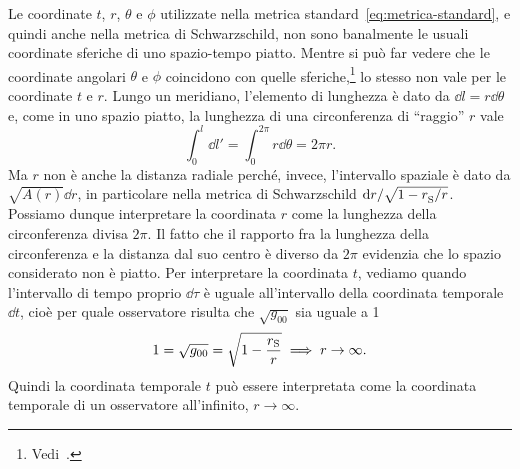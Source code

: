 Le coordinate $t$, $r$, $\theta$ e $\phi$ utilizzate nella metrica
standard~\eqref{eq:metrica-standard}, e quindi anche nella metrica di
Schwarzschild, non sono banalmente le usuali coordinate sferiche di uno
spazio-tempo piatto.  Mentre si può far vedere che le coordinate angolari
$\theta$ e $\phi$ coincidono con quelle
sferiche,\footnote{Vedi~\textcite[333]{ohanian:gravitazione}.} lo stesso non
vale per le coordinate $t$ e $r$.  Lungo un meridiano, l'elemento di lunghezza è
dato da $\dd l = r\dd\theta$ e, come in uno spazio piatto, la lunghezza di una
circonferenza di ``raggio'' $r$ vale
\begin{equation}
  \int_{0}^{l} \dd l' = \int_{0}^{2\pi}r\dd\theta = 2\pi r.
\end{equation}
Ma $r$ non è anche la distanza radiale perché, invece, l'intervallo spaziale è
dato da $\sqrt{A(r)}\dd r$, in particolare nella metrica di Schwarzschild
$\mathop{}\!\mathrm{d} r/\sqrt{1-r_{\textup{S}}^{}/r}$.  Possiamo dunque interpretare la
coordinata $r$ come la lunghezza della circonferenza divisa $2\pi$.  Il fatto
che il rapporto fra la lunghezza della circonferenza e la distanza dal suo
centro è diverso da $2\pi$ evidenzia che lo spazio considerato non è piatto.
Per interpretare la coordinata $t$, vediamo quando l'intervallo di tempo proprio
$\dd\tau$ è uguale all'intervallo della coordinata temporale $\dd t$, cioè per
quale osservatore risulta che $\sqrt{g_{00}}$ sia uguale a 1
\begin{equation}
  1 = \sqrt{g_{00}} = \sqrt{1 - \frac{r_{\textup{S}}}{r}} \implies r \to \infty.
\end{equation}
Quindi la coordinata temporale $t$ può essere interpretata come la coordinata
temporale di un osservatore all'infinito, $r \to \infty$.

